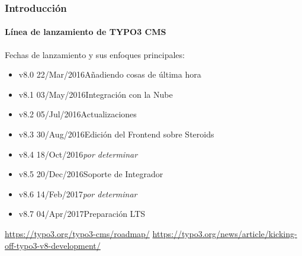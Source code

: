 \begin{frame}[fragile]
	\frametitle{Introducción}
	\framesubtitle{Línea de lanzamiento de TYPO3 CMS}

	Fechas de lanzamiento y sus enfoques principales:

	\begin{itemize}

		\item v8.0 \tabto{1.1cm}22/Mar/2016\tabto{3.4cm}Añadiendo cosas de última hora
		\item v8.1 \tabto{1.1cm}03/May/2016\tabto{3.4cm}Integración con la Nube
		\item
			\begingroup
				\color{typo3orange}
					v8.2 \tabto{1.1cm}05/Jul/2016\tabto{3.4cm}Actualizaciones
			\endgroup
		\item
			\begingroup
				\color{typo3orange}
					v8.3 \tabto{1.1cm}30/Aug/2016\tabto{3.4cm}Edición del Frontend  sobre Steroids
			\endgroup
		\item v8.4 \tabto{1.1cm}18/Oct/2016\tabto{3.4cm}\textit{por determinar}
		\item v8.5 \tabto{1.1cm}20/Dec/2016\tabto{3.4cm}Soporte de Integrador
		\item v8.6 \tabto{1.1cm}14/Feb/2017\tabto{3.4cm}\textit{por determinar}
		\item v8.7 \tabto{1.1cm}04/Apr/2017\tabto{3.4cm}Preparación LTS

	\end{itemize}

	\smaller
		\url{https://typo3.org/typo3-cms/roadmap/}\newline
		\url{https://typo3.org/news/article/kicking-off-typo3-v8-development/}
	\normalsize

\end{frame}

